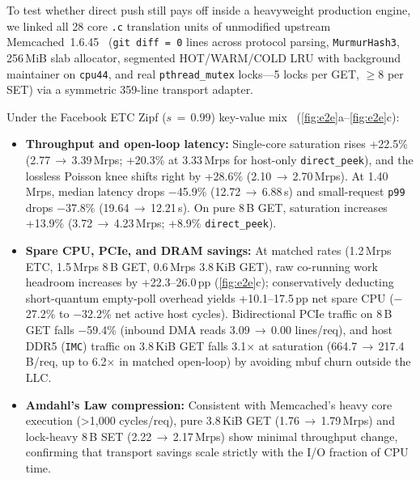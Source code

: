 To test whether direct push still pays off inside a heavyweight production engine, we linked all 28 core \texttt{.c} translation units of unmodified upstream Memcached~1.6.45~\cite{memcached2025} (\texttt{git diff\,=\,0} lines across protocol parsing, \texttt{MurmurHash3}, 256\,MiB slab allocator, segmented HOT/WARM/COLD LRU with background maintainer on \texttt{cpu44}, and real \texttt{pthread\_mutex} locks---5 locks per GET, $\ge$8 per SET) via a symmetric 359-line transport adapter.

Under the Facebook ETC Zipf ($s\,=\,0.99$) key-value mix~\cite{atikoglu2012memcached} (\autoref{fig:e2e}a--\ref{fig:e2e}c):
\begin{itemize}
  \item \textbf{Throughput and open-loop latency:} Single-core saturation rises +22.5\% (2.77\,$\to$\,3.39\,Mrps; +20.3\% at 3.33\,Mrps for host-only \texttt{direct\_peek}), and the lossless Poisson knee shifts right by +28.6\% (2.10\,$\to$\,2.70\,Mrps). At 1.40\,Mrps, median latency drops $-$45.9\% (12.72\,$\to$\,6.88\,\textmu s) and small-request \texttt{p99} drops $-$37.8\% (19.64\,$\to$\,12.21\,\textmu s). On pure 8\,B GET, saturation increases +13.9\% (3.72\,$\to$\,4.23\,Mrps; +8.9\% \texttt{direct\_peek}).
  \item \textbf{Spare CPU, PCIe, and DRAM savings:} At matched rates (1.2\,Mrps ETC, 1.5\,Mrps 8\,B GET, 0.6\,Mrps 3.8\,KiB GET), raw co-running work headroom increases by +22.3--26.0\,pp (\autoref{fig:e2e}c); conservatively deducting short-quantum empty-poll overhead yields +10.1--17.5\,pp net spare CPU ($-$27.2\% to $-$32.2\% net active host cycles). Bidirectional PCIe traffic on 8\,B GET falls $-$59.4\% (inbound DMA reads 3.09\,$\to$\,0.00 lines/req), and host DDR5 (\texttt{IMC}) traffic on 3.8\,KiB GET falls 3.1$\times$ at saturation (664.7\,$\to$\,217.4\,B/req, up to 6.2$\times$ in matched open-loop) by avoiding mbuf churn outside the LLC.
  \item \textbf{Amdahl's Law compression:} Consistent with Memcached's heavy core execution (>1,000 cycles/req), pure 3.8\,KiB GET (1.76\,$\to$\,1.79\,Mrps) and lock-heavy 8\,B SET (2.22\,$\to$\,2.17\,Mrps) show minimal throughput change, confirming that transport savings scale strictly with the I/O fraction of CPU time.
\end{itemize}

